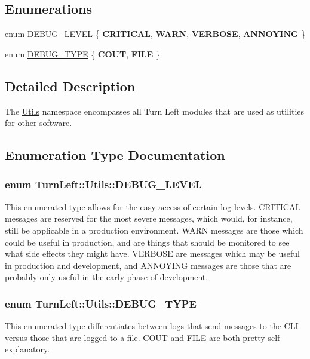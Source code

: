 \subsection*{Enumerations}
\begin{DoxyCompactItemize}
\item 
enum \hyperlink{namespaceTurnLeft_1_1Utils_a55225b27548ba5d55b26a6a5f1ba294e}{DEBUG\_\-LEVEL} \{ {\bfseries CRITICAL}, 
{\bfseries WARN}, 
{\bfseries VERBOSE}, 
{\bfseries ANNOYING}
 \}
\item 
enum \hyperlink{namespaceTurnLeft_1_1Utils_a9d1cba01e5417c6262d11cc154c9a252}{DEBUG\_\-TYPE} \{ {\bfseries COUT}, 
{\bfseries FILE}
 \}
\end{DoxyCompactItemize}


\subsection{Detailed Description}
The \hyperlink{namespaceTurnLeft_1_1Utils}{Utils} namespace encompasses all Turn Left modules that are used as utilities for other software. 

\subsection{Enumeration Type Documentation}
\hypertarget{namespaceTurnLeft_1_1Utils_a55225b27548ba5d55b26a6a5f1ba294e}{
\subsubsection[{DEBUG\_\-LEVEL}]{\setlength{\rightskip}{0pt plus 5cm}enum {\bf TurnLeft::Utils::DEBUG\_\-LEVEL}}}
\label{namespaceTurnLeft_1_1Utils_a55225b27548ba5d55b26a6a5f1ba294e}
This enumerated type allows for the easy access of certain log levels. CRITICAL messages are reserved for the most severe messages, which would, for instance, still be applicable in a production environment. WARN messages are those which could be useful in production, and are things that should be monitored to see what side effects they might have. VERBOSE are messages which may be useful in production and development, and ANNOYING messages are those that are probably only useful in the early phase of development. \hypertarget{namespaceTurnLeft_1_1Utils_a9d1cba01e5417c6262d11cc154c9a252}{
\subsubsection[{DEBUG\_\-TYPE}]{\setlength{\rightskip}{0pt plus 5cm}enum {\bf TurnLeft::Utils::DEBUG\_\-TYPE}}}
\label{namespaceTurnLeft_1_1Utils_a9d1cba01e5417c6262d11cc154c9a252}
This enumerated type differentiates between logs that send messages to the CLI versus those that are logged to a file. COUT and FILE are both pretty self-\/explanatory. 
